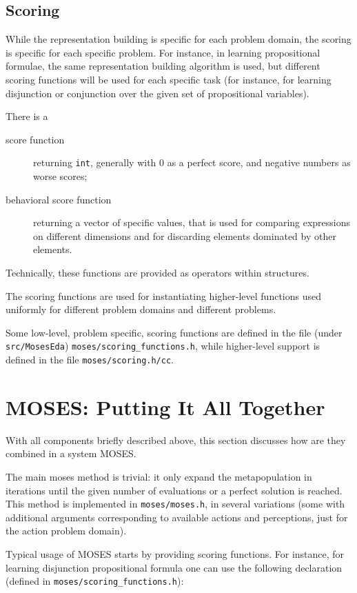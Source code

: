 \documentclass{article}
\begin{document}
\subsection{Scoring}

While the representation building is specific for each problem domain,
the scoring is specific for each specific problem. For instance, in
learning propositional formulae, the same representation building
algorithm is used, but different scoring functions will be used
for each specific task (for instance, for learning disjunction
or conjunction over the given set of propositional variables).

There is a 
\begin{description}
\item[score function] returning \verb|int|, generally with
0 as a perfect score, and negative numbers as worse scores;
\item[behavioral score function] returning a vector of specific 
values, that is used for comparing expressions on different 
dimensions and for discarding elements dominated by other elements.
\end{description}

Technically, these functions are provided as operators within 
structures. 

The scoring functions are used for instantiating higher-level
functions used uniformly for different problem domains and different
problems. 

Some low-level, problem specific, scoring functions are defined in 
the file (under \verb|src/MosesEda|) \verb|moses/scoring_functions.h|,
while higher-level support is defined in the file \verb|moses/scoring.h/cc|.

\section{MOSES: Putting It All Together}

With all components briefly described above, this section discusses
how are they combined in a system MOSES. 

The main moses method is trivial: it only expand the metapopulation 
in iterations until the given number of evaluations or a perfect
solution is reached. This method is implemented in \verb|moses/moses.h|,
in several variations (some with additional arguments corresponding to
available actions and perceptions, just for the action problem domain). 

Typical usage of MOSES starts by providing scoring functions. For 
instance, for learning disjunction propositional formula one can 
use the following declaration (defined in \verb|moses/scoring_functions.h|):
\end{document}
